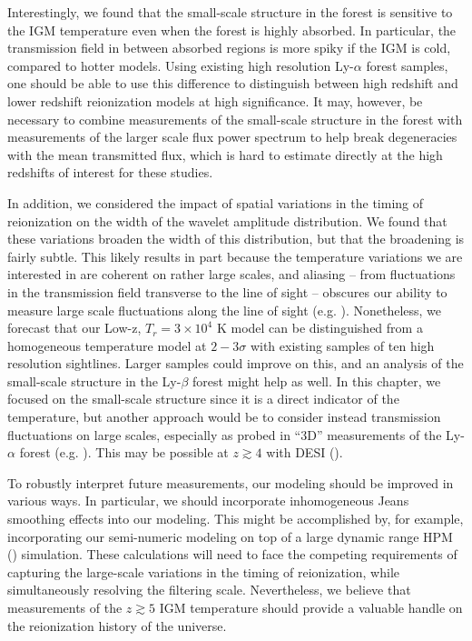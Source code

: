 Interestingly, we found that the small-scale structure in the
forest is sensitive to the IGM temperature even when the forest is highly absorbed. In particular, the transmission
field in between absorbed regions is more spiky if the IGM is cold, compared to hotter models. Using existing
high resolution Ly-$\alpha$ forest samples, one should be able to use this difference to 
distinguish between high redshift and lower
redshift reionization models at high significance. It may, however, be necessary to combine measurements
of the small-scale structure in the forest with measurements of the larger scale flux power spectrum to help
break degeneracies with the mean transmitted flux, which is hard to estimate directly at the high redshifts of
interest for these studies. 

In addition, we considered the impact of spatial variations in the timing of reionization on the width of
the wavelet amplitude distribution. We found that these variations broaden the width of this distribution, but
that the broadening is fairly subtle. This likely results in part because the temperature variations we
are interested in are coherent on rather large scales, and aliasing -- from fluctuations in the transmission
field transverse to the line of sight -- obscures our ability to measure large scale fluctuations along
the line of sight (e.g. \citealt{McQuinn:2010mq,Lai:2005ha}). Nonetheless, we forecast that our Low-z, $T_r=3 \times 10^4$
K model can be distinguished from a homogeneous temperature model at $2-3 \sigma$ with existing samples of ten high
resolution sightlines. Larger samples could improve on this, and an analysis of the small-scale structure in the
Ly-$\beta$ forest might help as well. In this chapter, we focused on the small-scale structure since it is a direct
indicator of the temperature, but another approach would be to consider instead transmission fluctuations on
large scales, especially as probed in ``3D'' measurements of the Ly-$\alpha$ forest (e.g. \citealt{McQuinn:2010mq}). This
may be possible at $z \gtrsim 4$ with DESI (\citealt{Levi:2013gra,McQuinn:2010mq}).

To robustly interpret future measurements, our modeling should be improved in various ways. In particular, we should incorporate
inhomogeneous Jeans smoothing effects into our modeling. This might be accomplished by, for example, 
incorporating our semi-numeric
modeling on top of a large dynamic range HPM (\citealt{Gnedin:1997td}) simulation. These 
calculations will need to face
the competing requirements of capturing the large-scale variations in the timing of reionization, while simultaneously
resolving the filtering scale. Nevertheless, we believe that measurements of the $z \gtrsim 5$ IGM temperature should
provide a valuable handle on the reionization history of the universe.



